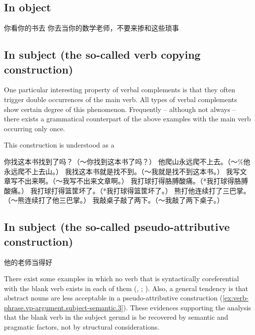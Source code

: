 \documentclass[UTF8, a4paper, oneside, scheme=plain, 12pt]{ctexrep}
\newcommand*{\citepage}[1]{p.~{#1}}
\begin{document}
\subsection{In object}

\begin{exe}
    \ex 你看你的书去
    \ex 你去当你的数学老师，不要来掺和这些琐事
\end{exe}

\subsection{In subject (the so-called verb copying construction)}

One particular interesting property of verbal complements is 
that they often trigger double occurrences of the main verb. 
All types of verbal complements show certain degree of this phenomenon.
Frequently -- although not always -- 
there exists a grammatical counterpart of the above examples with the main verb occurring only once.

This construction is understood as a 

\begin{exe}
    \ex 你找这本书找到了吗？（～你找到这本书了吗？）
    \ex 他爬山永远爬不上去。（～\%他永远爬不上去山。）
    \ex 我找这本书就是找不到。（～我就是找不到这本书。）
    \ex 我写文章写不出来啊。（～我写不出来文章啊。）
    \ex 我打球打得胳膊酸痛。（*我打球得胳膊酸痛。）
    \ex 我打球打得篮筐坏了。（*我打球得篮筐坏了。）
    \ex 熊打他连续打了三巴掌。（～熊连续打了他三巴掌。）
    \ex 我敲桌子敲了两下。（～我敲了两下桌子。）
\end{exe}

\subsection{In subject (the so-called pseudo-attributive construction)}

\begin{exe}
    \ex 他的老师当得好
\end{exe}

There exist some examples in which no verb that is syntactically coreferential with the 
blank verb exists in each of them
(,
; 
\citealt[\citepage{239}]{deng2010formal}).
Also, a general tendency is that abstract nouns are less acceptable 
in a pseudo-attributive construction 
(\ref{ex:verb-phrase.vp-argument.subject-semantic.3}).
These evidences supporting the analysis that the blank verb in the subject gerund 
is be recovered by semantic and pragmatic factors, 
not by structural considerations.
\end{document}
